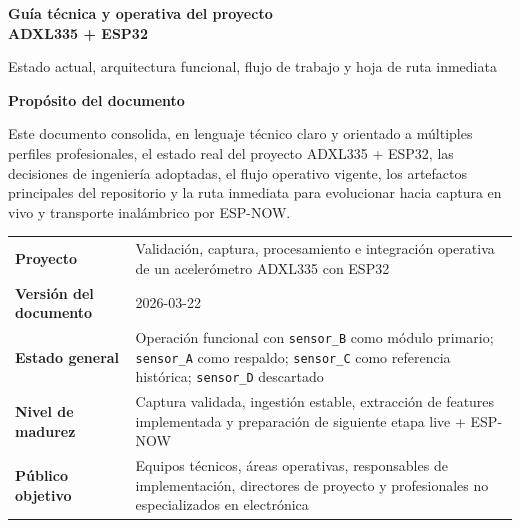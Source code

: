 \documentclass[11pt,a4paper]{article}
\begin{document}
\hypersetup{pageanchor=false}
\begin{titlepage}
\thispagestyle{empty}
\colorbox{Primary}{\parbox{\dimexpr\textwidth-2\fboxsep\relax}{\vspace{0.35cm}\hfill}}

\vspace{1.4cm}

{\Huge\bfseries\color{Primary} Guía técnica y operativa del proyecto \\
ADXL335 + ESP32\par}

\vspace{0.6cm}

{\Large\color{TextGray} Estado actual, arquitectura funcional, flujo de trabajo y hoja de ruta inmediata\par}

\vspace{1.2cm}

\begin{summarybox}
\textbf{Propósito del documento}\par
Este documento consolida, en lenguaje técnico claro y orientado a múltiples perfiles profesionales, el estado real del proyecto ADXL335 + ESP32, las decisiones de ingeniería adoptadas, el flujo operativo vigente, los artefactos principales del repositorio y la ruta inmediata para evolucionar hacia captura en vivo y transporte inalámbrico por ESP-NOW.
\end{summarybox}

\vspace{1.0cm}

\begin{tabularx}{\textwidth}{>{\bfseries}p{4.3cm}X}
Proyecto & Validación, captura, procesamiento e integración operativa de un acelerómetro ADXL335 con ESP32 \\
Versión del documento & 2026-03-22 \\
Estado general & Operación funcional con \texttt{sensor\_B} como módulo primario; \texttt{sensor\_A} como respaldo; \texttt{sensor\_C} como referencia histórica; \texttt{sensor\_D} descartado \\
Nivel de madurez & Captura validada, ingestión estable, extracción de features implementada y preparación de siguiente etapa live + ESP-NOW \\
Público objetivo & Equipos técnicos, áreas operativas, responsables de implementación, directores de proyecto y profesionales no especializados en electrónica \\
\end{tabularx}


\end{titlepage}
\end{document}
